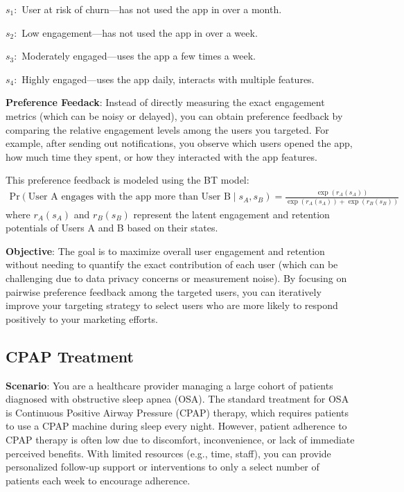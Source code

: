 \documentclass{article} %
\begin{document}
{$
s_1:$ User at risk of churn—has not used the app in over a month.

$
s_2:$ Low engagement—has not used the app in over a week.

$
s_3:$ Moderately engaged—uses the app a few times a week.

$
s_4:$ Highly engaged—uses the app daily, interacts with multiple features.

\textbf{Preference Feedack}: Instead of directly measuring the exact engagement metrics (which can be noisy or delayed), you can obtain preference feedback by comparing the relative engagement levels among the users you targeted. For example, after sending out notifications, you observe which users opened the app, how much time they spent, or how they interacted with the app features. 

This preference feedback is modeled using the BT model:
\begin{align*}
   \text{Pr}(\text{User A engages with the app more than User B} \mid s_A, s_B) = \frac{\exp(r_A(s_A))}{\exp(r_A(s_A)) + \exp(r_B(s_B))}
\end{align*}
where $r_A(s_A)$ and $r_B(s_B)$ represent the latent engagement and retention potentials of Users A and B based on their states.



\textbf{Objective}: The goal is to maximize overall user engagement and retention without needing to quantify the exact contribution of each user (which can be challenging due to data privacy concerns or measurement noise). By focusing on pairwise preference feedback among the targeted users, you can iteratively improve your targeting strategy to select users who are more likely to respond positively to your marketing efforts.

\subsection{CPAP Treatment} \label{sec:CPAP_description}

\textbf{Scenario}: You are a healthcare provider managing a large cohort of patients diagnosed with obstructive sleep apnea (OSA). The standard treatment for OSA is Continuous Positive Airway Pressure (CPAP) therapy, which requires patients to use a CPAP machine during sleep every night. However, patient adherence to CPAP therapy is often low due to discomfort, inconvenience, or lack of immediate perceived benefits. With limited resources (e.g., time, staff), you can provide personalized follow-up support or interventions to only a select number of patients each week to encourage adherence.


}
\end{document}
